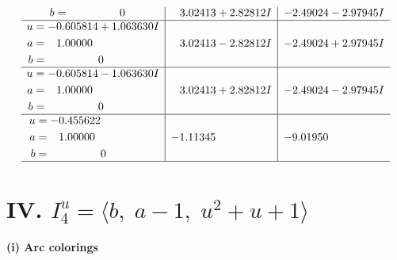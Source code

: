 \documentclass[1p]{elsarticle_modified}
\theoremstyle{definition}
\begin{document}
$$\begin{array}{c|c|c}
\begin{aligned}
b &= \phantom{-0.000000 } 0\end{aligned}
 & \phantom{-}3.02413 + 2.82812 I & -2.49024 - 2.97945 I \\ \hline\begin{aligned}
u &= -0.605814 + 1.063630 I \\
a &= \phantom{-}1.00000\phantom{ +0.000000I} \\
b &= \phantom{-0.000000 } 0\end{aligned}
 & \phantom{-}3.02413 - 2.82812 I & -2.49024 + 2.97945 I \\ \hline\begin{aligned}
u &= -0.605814 - 1.063630 I \\
a &= \phantom{-}1.00000\phantom{ +0.000000I} \\
b &= \phantom{-0.000000 } 0\end{aligned}
 & \phantom{-}3.02413 + 2.82812 I & -2.49024 - 2.97945 I \\ \hline\begin{aligned}
u &= -0.455622\phantom{ +0.000000I} \\
a &= \phantom{-}1.00000\phantom{ +0.000000I} \\
b &= \phantom{-0.000000 } 0\end{aligned}
 & -1.11345\phantom{ +0.000000I} & -9.01950\phantom{ +0.000000I}\\
 \hline 
 \end{array}$$\newpage\newpage\renewcommand{\arraystretch}{1}
\centering \section*{IV. $I^u_{4}= \langle b,\;a-1,\;u^2+u+1 \rangle$}
\flushleft \textbf{(i) Arc colorings}\\
\end{document}
